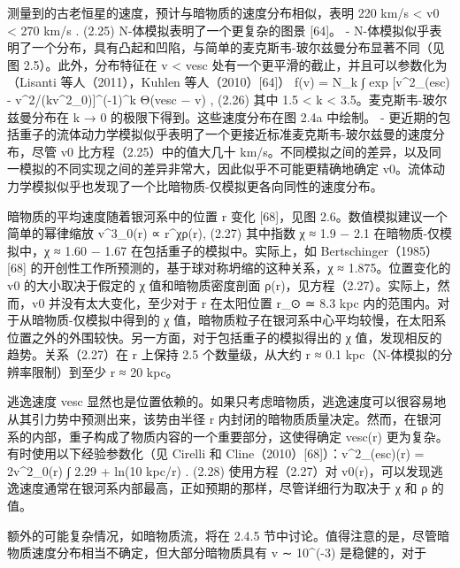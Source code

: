  
测量到的古老恒星的速度，预计与暗物质的速度分布相似，表明
220 km/s < v0 < 270 km/s . (2.25)
N-体模拟表明了一个更复杂的图景 [64]。
- N-体模拟似乎表明了一个分布，具有凸起和凹陷，与简单的麦克斯韦-玻尔兹曼分布显著不同（见图 2.5）。此外，分布特征在 v < vesc 处有一个更平滑的截止，并且可以参数化为（Lisanti 等人（2011），Kuhlen 等人（2010）[64]）
f(v) = N_k
∫ exp [v^2_(esc) - v^2/(kv^2_0)]^(-1)^k Θ(vesc − v) , (2.26)
其中 1.5 < k < 3.5。麦克斯韦-玻尔兹曼分布在 k → 0 的极限下得到。这些速度分布在图 2.4a 中绘制。
- 更近期的包括重子的流体动力学模拟似乎表明了一个更接近标准麦克斯韦-玻尔兹曼的速度分布，尽管 v0 比方程（2.25）中的值大几十 km/s。不同模拟之间的差异，以及同一模拟的不同实现之间的差异非常大，因此似乎不可能更精确地确定 v0。流体动力学模拟似乎也发现了一个比暗物质-仅模拟更各向同性的速度分布。

暗物质的平均速度随着银河系中的位置 r 变化 [68]，见图 2.6。数值模拟建议一个简单的幂律缩放
v^3_0(r) ∝ r^χρ(r), (2.27)
其中指数 χ ≈ 1.9 − 2.1 在暗物质-仅模拟中，χ ≈ 1.60 − 1.67 在包括重子的模拟中。实际上，如 Bertschinger（1985）[68] 的开创性工作所预测的，基于球对称坍缩的这种关系，χ ≈ 1.875。位置变化的 v0 的大小取决于假定的 χ 值和暗物质密度剖面 ρ(r)，见方程（2.27）。实际上，然而，v0 并没有太大变化，至少对于 r 在太阳位置 r_⊙ ≃ 8.3 kpc 内的范围内。对于从暗物质-仅模拟中得到的 χ 值，暗物质粒子在银河系中心平均较慢，在太阳系位置之外的外围较快。另一方面，对于包括重子的模拟得出的 χ 值，发现相反的趋势。关系（2.27）在 r 上保持 2.5 个数量级，从大约 r ≈ 0.1 kpc（N-体模拟的分辨率限制）到至少 r ≈ 20 kpc。

逃逸速度 vesc 显然也是位置依赖的。如果只考虑暗物质，逃逸速度可以很容易地从其引力势中预测出来，该势由半径 r 内封闭的暗物质质量决定。然而，在银河系的内部，重子构成了物质内容的一个重要部分，这使得确定 vesc(r) 更为复杂。有时使用以下经验参数化（见 Cirelli 和 Cline（2010）[68]）：v^2_(esc)(r) = 2v^2_0(r) ∫ 2.29 + ln(10 kpc/r) . (2.28)
使用方程（2.27）对 v0(r)，可以发现逃逸速度通常在银河系内部最高，正如预期的那样，尽管详细行为取决于 χ 和 ρ 的值。

额外的可能复杂情况，如暗物质流，将在 2.4.5 节中讨论。值得注意的是，尽管暗物质速度分布相当不确定，但大部分暗物质具有 v ∼ 10^(-3) 是稳健的，对于 


